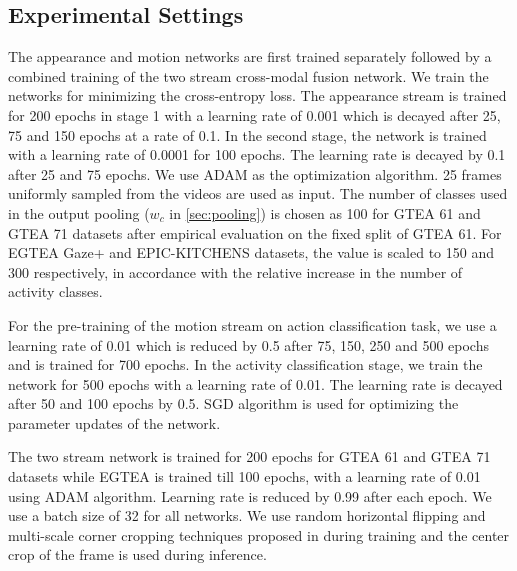 \documentclass[10pt,twocolumn,letterpaper]{article}
\begin{document}
\subsection{Experimental Settings}
	The appearance and motion networks are first trained separately followed by a combined training of the two stream cross-modal fusion network.	We train the networks for minimizing the cross-entropy loss. The appearance stream is trained for 200 epochs in stage 1 with a learning rate of 0.001 which is decayed after 25, 75 and 150 epochs at a rate of 0.1. In the second stage, the network is trained with a learning rate of 0.0001 for 100 epochs. The learning rate is decayed by 0.1 after 25 and 75 epochs. We use ADAM as the optimization algorithm. 25 frames uniformly sampled from the videos are used as input. The number of classes used in the output pooling ($w_c$ in \ref{sec:pooling}) is chosen as 100 for GTEA 61 and GTEA 71 datasets after empirical evaluation on the fixed split of GTEA 61. For EGTEA Gaze+ and EPIC-KITCHENS datasets, the value is scaled to 150 and 300 respectively, in accordance with the relative increase in the number of activity classes.

	For the pre-training of the motion stream on action classification task, we use a learning rate of 0.01 which is reduced by 0.5 after 75, 150, 250 and 500 epochs and is trained for 700 epochs. In the activity classification stage, we train the network for 500 epochs with a learning rate of 0.01. The learning rate is decayed after 50 and 100 epochs by 0.5. SGD algorithm is used for optimizing the parameter updates of the network.
	
	The two stream network is trained for 200 epochs for GTEA 61 and GTEA 71 datasets while EGTEA is trained till 100 epochs, with a learning rate of 0.01 using ADAM algorithm. Learning rate is reduced by 0.99 after each epoch. We use a batch size of 32 for all networks. We use random horizontal flipping and multi-scale corner cropping techniques proposed in \cite{TSN2016ECCV} during training and the center crop of the frame is used during inference.
	
	
	
\end{document}

